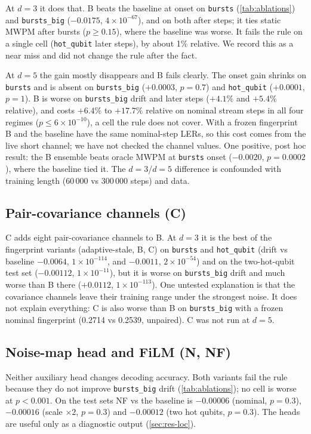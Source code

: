 \documentclass[11pt,a4paper]{article}
\newcommand{\reg}[1]{\texttt{#1}}
\newcommand{\E}[2]{${#1}{\times}10^{-#2}$}
\newcommand{\Eb}[2]{{#1}{\times}10^{-#2}}
\begin{document}
At $d=3$ it does that. B beats the baseline at onset on \reg{bursts} (\cref{tab:ablations}) and \reg{bursts\_big}
($-0.0175$, \E{4}{67}), and on both after steps; it ties static MWPM after bursts ($p\ge0.15$), where the baseline was
worse. It fails the rule on a single cell (\reg{hot\_qubit} later steps), by about 1\% relative. We record this as a near miss and did not change the rule after the fact.

At $d=5$ the gain mostly disappears and B fails clearly. The onset gain shrinks on \reg{bursts} and is absent on \reg{bursts\_big} ($+0.0003$, $p=0.7$) and \reg{hot\_qubit} ($+0.0001$, $p=1$). B is worse on
\reg{bursts\_big} drift and later steps ($+4.1\%$ and $+5.4\%$ relative), and costs
$+6.4\%$ to $+17.7\%$ relative on nominal stream steps in all four regimes ($p\le\Eb{6}{10}$), a cell the rule does not
cover. With a frozen fingerprint B and the baseline have the same nominal-step LERs, so this cost comes from the
live short channel; we have not checked the channel values. One positive, post hoc result: the B ensemble beats oracle MWPM
at \reg{bursts} onset ($-0.0020$, $p=0.0002$), where the baseline tied it. The $d=3$/$d=5$ difference is confounded
with training length (60\,000 vs 300\,000 steps) and data.

\subsection{Pair-covariance channels (C)}
C adds eight pair-covariance channels to B. At $d=3$ it is the best of the fingerprint variants (adaptive-stale, B, C) on \reg{bursts} and \reg{hot\_qubit} (drift
vs baseline $-0.0064$, \E{1}{114}, and $-0.0011$, \E{2}{54}) and on the two-hot-qubit test set ($-0.00112$, \E{1}{11}),
but it is worse on \reg{bursts\_big} drift and much worse than B there ($+0.0112$, \E{1}{113}).
One untested explanation is that the covariance channels leave their training range under the strongest noise. It
does not explain everything: C is also worse than B on \reg{bursts\_big} with a frozen nominal fingerprint (0.2714 vs
0.2539, unpaired). C was not run at $d=5$.

\subsection{Noise-map head and FiLM (N, NF)}
Neither auxiliary head changes decoding accuracy. Both variants fail the rule because they do not improve
\reg{bursts\_big} drift (\cref{tab:ablations}); no cell is worse at $p<0.001$. On the test sets NF vs the baseline is $-0.00006$ (nominal, $p=0.3$), $-0.00016$ (scale $\times2$,
$p=0.3$) and $-0.00012$ (two hot qubits, $p=0.3$). The heads are useful only as a diagnostic output (\cref{sec:res-loc}).
\end{document}
